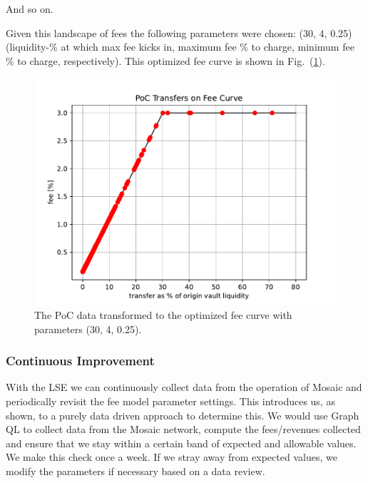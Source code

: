 And so on.

Given this landscape of fees the following parameters were chosen: (30, 4, 0.25) (liquidity-\% at which max fee kicks in, maximum fee \% to charge, minimum fee \% to charge, respectively).
%
This optimized fee curve is shown in Fig.~(\ref{fig:pocdatafeesopt}).
%
\begin{figure}
    \centering
    \includegraphics[scale=0.8]{images/mosaic/poc_optimized.pdf}
    \caption{The PoC data transformed to the optimized fee curve with parameters (30, 4, 0.25).}
    \label{fig:pocdatafeesopt}
\end{figure}
%

\subsubsection{Continuous Improvement}

With the LSE we can continuously collect data from the operation of Mosaic and periodically revisit the fee model parameter settings.
%
This introduces us, as shown, to a purely data driven approach to determine this. We would use Graph QL \cite{GraphQLAPI} to collect data from the Mosaic network, compute the fees/revenues collected and ensure that we stay within a certain band of expected and allowable values. We make this check once a week.
%
If we stray away from expected values, we modify the parameters if necessary based on a data review.
